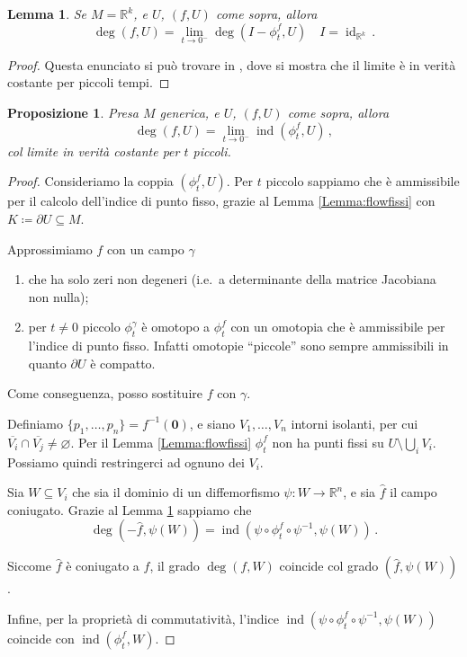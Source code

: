 \documentclass[a4paper, 11pt]{article}
\theoremstyle{definition}
\theoremstyle{plain}
\newtheorem{Lemma}[Def]{Lemma}
\newtheorem{Prop}[Def]{Proposizione}
\newcommand{\zero}{\mathbf{0}}
\newcommand{\eset}{\varnothing}
\newcommand{\R}{\mathbb{R}}
\newcommand{\cl}[1]{\overline{#1}}
\newcommand{\deff}{\coloneqq}
\DeclareMathOperator{\id}{id}
\DeclareMathOperator{\ind}{ind}
\begin{document}
\begin{Lemma}\label{Lemma:degind}
	Se $M = \R^k$, e $U$, $(f,U)$ come sopra, allora
	\[
		\deg(f,U) = \lim_{t \to 0^-}\deg(I-\phi_t^f,U) \quad I = \id_{\R^k}\,.
	\]
\end{Lemma}
\begin{proof}
	Questa enunciato si può trovare in \cite[Prop. 3.3]{FuriPeraSpadini2005}, dove si mostra che il limite è in verità costante per piccoli tempi.
\end{proof}
\begin{Prop}
	Presa $M$ generica, e $U$, $(f,U)$ come sopra, allora
	\begin{equation}\label{eq:degind}
		\deg(f,U) = \lim_{t \to 0^-}\ind(\phi_t^f,U)\,,
	\end{equation}
	col limite in verità costante per $t$ piccoli.
\end{Prop}
\begin{proof}
	Consideriamo la coppia $(\phi_t^f,U)$. Per $t$ piccolo sappiamo che è ammissibile per il calcolo dell'indice di punto fisso, grazie al Lemma \ref{Lemma:flowfissi} con $K \deff \partial U \subseteq M$.

	Approssimiamo $f$ con un campo $\gamma$
	\begin{enumerate}
		\item che ha solo zeri non degeneri (i.e.\ a determinante della matrice Jacobiana non nulla);
		\item per $t \neq 0$ piccolo $\phi_t^\gamma$ è omotopo a $\phi_t^f$ con un omotopia che è ammissibile per l'indice di punto fisso. Infatti omotopie ``piccole'' sono sempre ammissibili in quanto $\partial U$ è compatto.
	\end{enumerate} 
	Come conseguenza, posso sostituire $f$ con $\gamma$. 
	
	Definiamo $\{p_1, \dots, p_n\} = f^{-1}(\zero)$, e siano $V_1, \dots, V_n$ intorni isolanti, per cui $\cl{V_i} \cap \cl{V_j} \neq \eset$. Per il Lemma \ref{Lemma:flowfissi} $\phi_t^f$ non ha punti fissi su $U \setminus \bigcup_iV_i$. Possiamo quindi restringerci ad ognuno dei $V_i$.
	
	Sia $W \subseteq V_i$ che sia il dominio di un diffemorfismo $\psi \colon W \to \R^n$, e sia $\hat{f}$ il campo coniugato. Grazie al Lemma \ref{Lemma:degind} sappiamo che
	\[
		\deg(-\hat{f}, \psi(W)) = \ind(\psi \circ \phi_t^f \circ \psi^{-1}, \psi(W))\,.
	\]
	
	Siccome $\hat{f}$ è coniugato a $f$, il grado $\deg(f,W)$ coincide col grado $(\hat{f}, \psi(W))$. 
	
	Infine, per la proprietà di commutatività, l'indice $\ind(\psi \circ \phi_t^f \circ \psi^{-1}, \psi(W))$ coincide con $\ind(\phi_t^f, W)$.
\end{proof}
\end{document}

